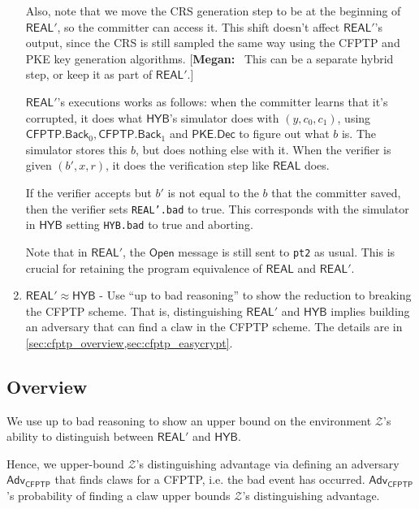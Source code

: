 \documentclass{article}[12pt]
\newcommand{\authnote}[2]{[{\color{red}\textbf{#1:}}~{\color{blue} #2}]}
\newcommand{\authnote}[2]{}
\newcommand{\megan}[1]{\authnote{Megan}{#1}}
\newcommand{\code}[1]{\texttt{#1}} %
\newcommand{\OpenMsg}{\mathsf{Open}}
\newcommand{\PKE}{\mathsf{PKE}}
\newcommand{\Dec}{\mathsf{Dec}}
\newcommand{\CFPTP}{\mathsf{CFPTP}}
\newcommand{\Back}{\mathsf{Back}}
\newcommand{\Adversary}{{\mathsf{Adv}}} %
\newcommand{\Environment}{{\mathcal{Z}}} %
\newcommand{\CFPTPAdversary}{{\Adversary_\CFPTP}}
\newcommand{\Hyb}{{\mathsf{HYB}}}
\newcommand{\Real}{{\mathsf{REAL}}}
\begin{document}
\begin{enumerate}
	Also, note that we move the CRS generation step to be at the beginning of $\Real'$, so the committer can access it. This shift doesn't affect $\Real'$'s output, since the CRS is still sampled the same way using the CFPTP and PKE key generation algorithms. \megan{This can be a separate hybrid step, or keep it as part of $\Real'$.}

	$\Real'$'s executions works as follows: when the committer learns that it's corrupted, it does what $\Hyb$'s simulator does with $(y, c_0, c_1)$, using $\CFPTP.\Back_0, \CFPTP.\Back_1$ and $\PKE.\Dec$ to figure out what $b$ is. The simulator stores this $b$, but does nothing else with it. When the verifier is given $(b', x, r)$, it does the verification step like $\Real$ does.

	If the verifier accepts but $b'$ is not equal to the $b$ that the committer saved, then the verifier sets \code{REAL'.bad} to true. This corresponds with the simulator in $\Hyb$ setting \code{HYB.bad} to true and aborting.

	Note that in $\Real'$, the $\OpenMsg$ message is still sent to \code{pt2} as usual. This is crucial for retaining the program equivalence of $\Real$ and $\Real'$.

	\item\label{hyb:1.2} $\Real' \approx \Hyb$ - Use ``up to bad reasoning'' to show the reduction to breaking the CFPTP scheme. That is, distinguishing $\Real'$ and $\Hyb$ implies building an adversary that can find a claw in the CFPTP scheme. The details are in \cref{sec:cfptp_overview,sec:cfptp_easycrypt}.

\end{enumerate}

\subsection{Overview}\label{sec:cfptp_overview}
We use up to bad reasoning to show an upper bound on the environment $\Environment$'s ability to distinguish between $\Real'$ and $\Hyb$.

Hence, we upper-bound $\Environment$'s distinguishing advantage via defining an adversary $\CFPTPAdversary$ that finds claws for a CFPTP, i.e. the bad event has occurred. $\CFPTPAdversary$'s probability of finding a claw upper bounds $\Environment$'s distinguishing advantage.
\end{document}
